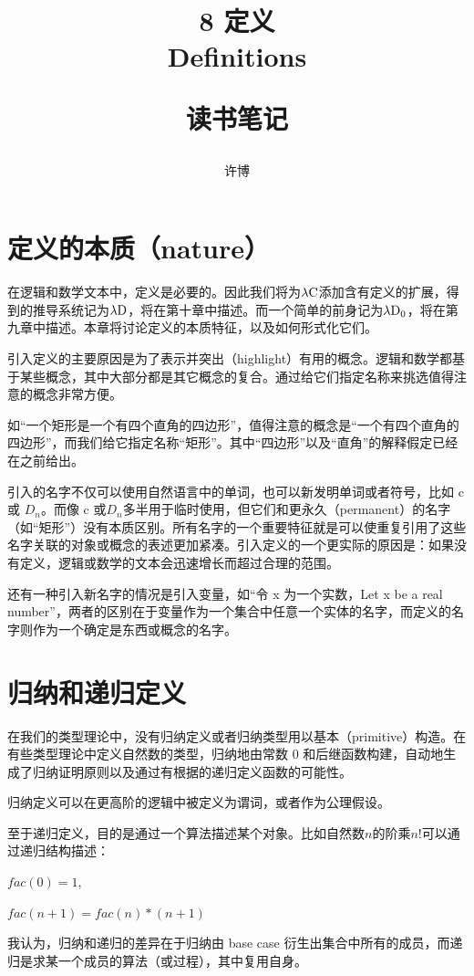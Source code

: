 \documentclass[UTF8]{article}
\title{8 定义\\Definitions\\[2ex]\begin{large}读书笔记\end{large}}
\author{许博}
\date{}
\begin{document}
\maketitle
	\section{定义的本质（nature）}
	\noindent
	在逻辑和数学文本中，定义是必要的。因此我们将为$\lambda{\rm C}$添加含有定义的扩展，得到的推导系统记为$\lambda{\rm D}$，将在第十章中描述。而一个简单的前身记为$\lambda{\rm D_0}$，将在第九章中描述。本章将讨论定义的本质特征，以及如何形式化它们。
	
		引入定义的主要原因是为了表示并突出（highlight）有用的概念。逻辑和数学都基于某些概念，其中大部分都是其它概念的复合。通过给它们指定名称来挑选值得注意的概念非常方便。
		
		如“一个矩形是一个有四个直角的四边形”，值得注意的概念是“一个有四个直角的四边形”，而我们给它指定名称“矩形”。其中“四边形”以及“直角”的解释假定已经在之前给出。
		
		引入的名字不仅可以使用自然语言中的单词，也可以新发明单词或者符号，比如 c 或 $D_n$。而像 c 或$D_n$多半用于临时使用，但它们和更永久（permanent）的名字（如“矩形”）没有本质区别。所有名字的一个重要特征就是可以使重复引用了这些名字关联的对象或概念的表述更加紧凑。引入定义的一个更实际的原因是：如果没有定义，逻辑或数学的文本会迅速增长而超过合理的范围。
		
		还有一种引入新名字的情况是引入变量，如“令 x 为一个实数，Let x be a real number”，两者的区别在于变量作为一个集合中任意一个实体的名字，而定义的名字则作为一个确定是东西或概念的名字。
	
	\section{归纳和递归定义}
	\noindent
	在我们的类型理论中，没有归纳定义或者归纳类型用以基本（primitive）构造。在有些类型理论中定义自然数的类型，归纳地由常数 0 和后继函数构建，自动地生成了归纳证明原则以及通过有根据的递归定义函数的可能性。
	
		归纳定义可以在更高阶的逻辑中被定义为谓词，或者作为公理假设。
		
		至于递归定义，目的是通过一个算法描述某个对象。比如自然数$n$的阶乘$n!$可以通过递归结构描述：
		
		$fac(0) = 1$,
		
		$fac(n+1)=fac(n)*(n+1)$
		
		我认为，归纳和递归的差异在于归纳由 base case 衍生出集合中所有的成员，而递归是求某一个成员的算法（或过程），其中复用自身。
		
\end{document}
